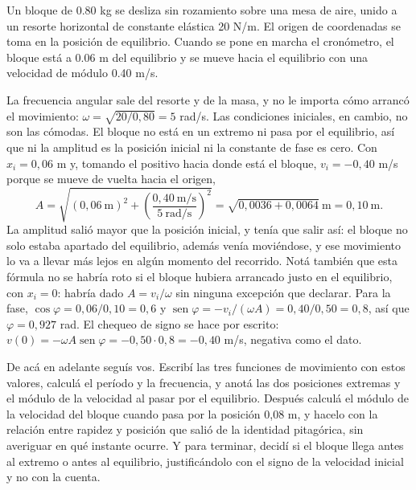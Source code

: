 \documentclass[11pt,openany]{book}
\newcommand{\sen}{\operatorname{sen}}
\begin{document}
\begin{ejemplo}[parcial]
Un bloque de 0.80 kg se desliza sin rozamiento sobre una mesa de aire, unido a un resorte horizontal de constante elástica 20 N/m. El origen de coordenadas se toma en la posición de equilibrio. Cuando se pone en marcha el cronómetro, el bloque está a 0.06 m del equilibrio y se mueve hacia el equilibrio con una velocidad de módulo 0.40 m/s.

La frecuencia angular sale del resorte y de la masa, y no le importa cómo arrancó el movimiento: $\omega = \sqrt{20/0{,}80} = 5$ rad/s. Las condiciones iniciales, en cambio, no son las cómodas. El bloque no está en un extremo ni pasa por el equilibrio, así que ni la amplitud es la posición inicial ni la constante de fase es cero. Con $x_i = 0{,}06$ m y, tomando el positivo hacia donde está el bloque, $v_i = -0{,}40$ m/s porque se mueve de vuelta hacia el origen,
\[
A = \sqrt{(0{,}06\ \mathrm{m})^{2} + \left(\frac{0{,}40\ \mathrm{m/s}}{5\ \mathrm{rad/s}}\right)^{2}} = \sqrt{0{,}0036 + 0{,}0064}\ \mathrm{m} = 0{,}10\ \mathrm{m} .
\]
La amplitud salió mayor que la posición inicial, y tenía que salir así: el bloque no solo estaba apartado del equilibrio, además venía moviéndose, y ese movimiento lo va a llevar más lejos en algún momento del recorrido. Notá también que esta fórmula no se habría roto si el bloque hubiera arrancado justo en el equilibrio, con $x_i = 0$: habría dado $A = v_i/\omega$ sin ninguna excepción que declarar. Para la fase, $\cos\varphi = 0{,}06/0{,}10 = 0{,}6$ y $\sen\varphi = -v_i/(\omega A) = 0{,}40/0{,}50 = 0{,}8$, así que $\varphi = 0{,}927$ rad. El chequeo de signo se hace por escrito: $v(0) = -\omega A \sen\varphi = -0{,}50 \cdot 0{,}8 = -0{,}40$ m/s, negativa como el dato.

De acá en adelante seguís vos. Escribí las tres funciones de movimiento con estos valores, calculá el período y la frecuencia, y anotá las dos posiciones extremas y el módulo de la velocidad al pasar por el equilibrio. Después calculá el módulo de la velocidad del bloque cuando pasa por la posición 0,08 m, y hacelo con la relación entre rapidez y posición que salió de la identidad pitagórica, sin averiguar en qué instante ocurre. Y para terminar, decidí si el bloque llega antes al extremo o antes al equilibrio, justificándolo con el signo de la velocidad inicial y no con la cuenta.
\end{ejemplo}
\end{document}
